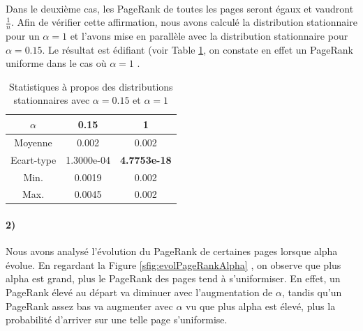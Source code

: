 \documentclass[a4paper,titlepage]{report}
\begin{document}
\paragraph{}
Dans le deuxième cas, les PageRank de toutes les pages seront égaux et vaudront $\frac{1}{n}$. Afin de vérifier cette affirmation, nous avons calculé la distribution stationnaire pour un $\alpha = 1$ et l'avons mise en parallèle avec la distribution stationnaire pour $\alpha = 0.15$. Le résultat est édifiant (voir Table \ref{tab:alpha_comp}, on constate en effet un PageRank uniforme dans le cas où $\alpha = 1$ .
\begin{table}[h]
	\center
	\begin{tabular}{|c|c|c|}
		\hline 
		$\alpha$   & 0.15  & 1 \\
		\hline
	 	Moyenne    & 0.002 & 0.002\\
	 	Ecart-type & 1.3000e-04 & \textbf{4.7753e-18} \\
	 	Min.       & 0.0019 & 0.002\\
	 	Max.       & 0.0045 & 0.002\\
	 	\hline
	\end{tabular}
	\caption{Statistiques à propos des distributions stationnaires avec $\alpha = 0.15$ et $\alpha = 1$}
	\label{tab:alpha_comp}
\end{table}
\paragraph{2)}
Nous avons analysé l'évolution du PageRank de certaines pages lorsque alpha évolue. En regardant la Figure \ref{sfig:evolPageRankAlpha} , on observe que plus alpha est grand, plus le PageRank des pages tend à s'uniformiser. En effet, un PageRank élevé au départ va diminuer avec l'augmentation de $\alpha$, tandis qu'un PageRank assez bas va augmenter avec $\alpha$ vu que plus alpha est élevé, plus la probabilité d'arriver sur une telle page s'uniformise.   
\end{document}
